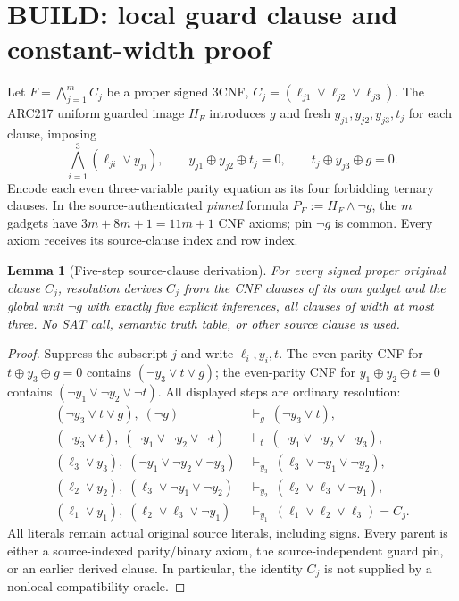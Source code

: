 \documentclass[11pt]{article}
\newtheorem{lemma}[theorem]{Lemma}
\begin{document}
\section{BUILD: local guard clause and constant-width proof}
Let $F=\bigwedge_{j=1}^m C_j$ be a proper signed 3CNF, $C_j=(\ell_{j1}\vee\ell_{j2}\vee\ell_{j3})$. The ARC217 uniform guarded image $H_F$ introduces $g$ and fresh $y_{j1},y_{j2},y_{j3},t_j$ for each clause, imposing
\begin{equation}\label{eq:gadget}
\bigwedge_{i=1}^3(\ell_{ji}\vee y_{ji}),\qquad
 y_{j1}\oplus y_{j2}\oplus t_j=0,\qquad
 t_j\oplus y_{j3}\oplus g=0.
\end{equation}
Encode each even three-variable parity equation as its four forbidding ternary clauses. In the source-authenticated \emph{pinned} formula $P_F:=H_F\wedge\neg g$, the $m$ gadgets have $3m+8m+1=11m+1$ CNF axioms; pin $\neg g$ is common. Every axiom receives its source-clause index and row index.
\begin{lemma}[Five-step source-clause derivation]\label{lem:five}
For every signed proper original clause $C_j$, resolution derives $C_j$ from the CNF clauses of its own gadget and the global unit $\neg g$ with \emph{exactly five explicit inferences}, all clauses of width at most three. No SAT call, semantic truth table, or other source clause is used.
\end{lemma}
\begin{proof}
Suppress the subscript $j$ and write $\ell_i,y_i,t$. The even-parity CNF for $t\oplus y_3\oplus g=0$ contains $(\neg y_3\vee t\vee g)$; the even-parity CNF for $y_1\oplus y_2\oplus t=0$ contains $(\neg y_1\vee\neg y_2\vee\neg t)$. All displayed steps are ordinary resolution:
\begin{align*}
(\neg y_3\vee t\vee g),\;(\neg g) &\ \vdash_{g}\ (\neg y_3\vee t), \\
(\neg y_3\vee t),\;(\neg y_1\vee\neg y_2\vee\neg t)&\ \vdash_t\ (\neg y_1\vee\neg y_2\vee\neg y_3),\\
(\ell_3\vee y_3),\;(\neg y_1\vee\neg y_2\vee\neg y_3)&\ \vdash_{y_3}\ (\ell_3\vee\neg y_1\vee\neg y_2),\\
(\ell_2\vee y_2),\;(\ell_3\vee\neg y_1\vee\neg y_2)&\ \vdash_{y_2}\ (\ell_2\vee\ell_3\vee\neg y_1),\\
(\ell_1\vee y_1),\;(\ell_2\vee\ell_3\vee\neg y_1)&\ \vdash_{y_1}\ (\ell_1\vee\ell_2\vee\ell_3)=C_j.
\end{align*}
All literals remain actual original source literals, including signs. Every parent is either a source-indexed parity/binary axiom, the source-independent guard pin, or an earlier derived clause. In particular, the identity $C_j$ is not supplied by a nonlocal compatibility oracle.
\end{proof}
\end{document}
